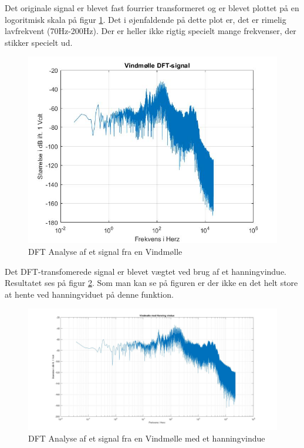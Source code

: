 Det originale signal er blevet fast fourrier transformeret og er blevet plottet på en logoritmisk skala på figur \ref{fig:Vind DFT}. Det i øjenfaldende på dette plot er, det er rimelig lavfrekvent (70Hz-200Hz). Der er heller ikke rigtig specielt mange frekvenser, der stikker specielt ud.
\begin{figure}[H]
	\centering
	\includegraphics[width=140mm]{figures/Vind/DFT.jpg}
	\caption{DFT Analyse af et signal fra en Vindmølle}
	\label{fig:Vind DFT}
\end{figure}

Det DFT-transfomerede signal er blevet vægtet ved brug af et hanningvindue. Resultatet ses på figur \ref{fig:Vind hanning}. Som man kan se på figuren er der ikke en det helt store at hente ved hanningviduet på denne funktion.
\begin{figure}[H]
	\centering
	\includegraphics[width=140mm]{figures/Vind/hanning.jpg}
	\caption{DFT Analyse af et signal fra en Vindmølle med et hanningvindue}
	\label{fig:Vind hanning}
\end{figure}

